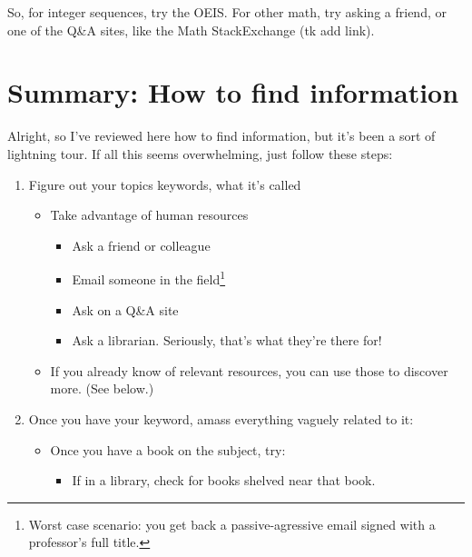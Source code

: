 So, for integer sequences, try the OEIS. For other math, try asking a friend, or
one of the Q\&A sites, like the Math StackExchange (tk add link).

\section{Summary: How to find information}

Alright, so I've reviewed here how to find information, but it's been a sort of
lightning tour. If all this seems overwhelming, just follow these steps:

\begin{enumerate}
\item Figure out your topics keywords, what it's called
  \begin{itemize}
  \item Take advantage of human resources
    \begin{itemize}
    \item Ask a friend or colleague
    \item Email someone in the field\footnote{Worst case scenario: you get back a
      passive-agressive email signed with a professor's full title.}
    \item Ask on a Q\&A site
    \item Ask a librarian. Seriously, that's what they're there for!
    \end{itemize}
  \item If you already know of relevant resources, you can use those to discover
    more. (See below.)
  \end{itemize}
\item Once you have your keyword, amass everything vaguely related to it:
  \begin{itemize}
    \begin{itemize}
    \item Search for a textbook on the topic.
    \item Search for a review article on the textbook.
    \item Search for an annotated bibliography.
    \item Check the references on Wikipedia for your subject.
    \end{itemize}
  \item Once you have a book on the subject, try:
    \begin{itemize}
    \item If in a library, check for books shelved near that book.

\end{itemize}
\end{itemize}
\end{enumerate}
